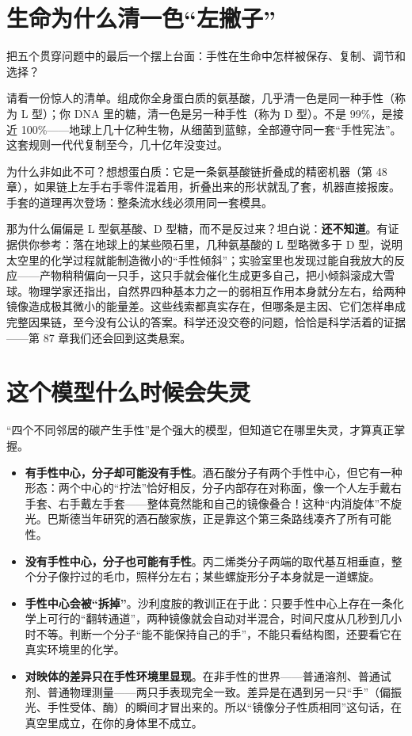 \section{生命为什么清一色“左撇子”}

把五个贯穿问题中的最后一个摆上台面：手性在生命中怎样被保存、复制、调节和选择？

请看一份惊人的清单。组成你全身蛋白质的氨基酸，几乎清一色是同一种手性（称为 L 型）；你 DNA 里的糖，清一色是另一种手性（称为 D 型）。不是 99\%，是接近 100\%——地球上几十亿种生物，从细菌到蓝鲸，全部遵守同一套“手性宪法”。这套规则一代代复制至今，几十亿年没变过。

为什么非如此不可？想想蛋白质：它是一条氨基酸链折叠成的精密机器（第 48 章），如果链上左手右手零件混着用，折叠出来的形状就乱了套，机器直接报废。手套的道理再次登场：整条流水线必须用同一套模具。

那为什么偏偏是 L 型氨基酸、D 型糖，而不是反过来？坦白说：\textbf{还不知道}。有证据供你参考：落在地球上的某些陨石里，几种氨基酸的 L 型略微多于 D 型，说明太空里的化学过程就能制造微小的“手性倾斜”；实验室里也发现过能自我放大的反应——产物稍稍偏向一只手，这只手就会催化生成更多自己，把小倾斜滚成大雪球。物理学家还指出，自然界四种基本力之一的弱相互作用本身就分左右，给两种镜像造成极其微小的能量差。这些线索都真实存在，但哪条是主因、它们怎样串成完整因果链，至今没有公认的答案。科学还没交卷的问题，恰恰是科学活着的证据——第 87 章我们还会回到这类悬案。

\section{这个模型什么时候会失灵}

“四个不同邻居的碳产生手性”是个强大的模型，但知道它在哪里失灵，才算真正掌握。

\begin{itemize}[itemsep=2pt]
\item \textbf{有手性中心，分子却可能没有手性}。酒石酸分子有两个手性中心，但它有一种形态：两个中心的“拧法”恰好相反，分子内部存在对称面，像一个人左手戴右手套、右手戴左手套——整体竟然能和自己的镜像叠合！这种“内消旋体”不旋光。巴斯德当年研究的酒石酸家族，正是靠这个第三条路线凑齐了所有可能性。
\item \textbf{没有手性中心，分子也可能有手性}。丙二烯类分子两端的取代基互相垂直，整个分子像拧过的毛巾，照样分左右；某些螺旋形分子本身就是一道螺旋。
\item \textbf{手性中心会被“拆掉”}。沙利度胺的教训正在于此：只要手性中心上存在一条化学上可行的“翻转通道”，两种镜像就会自动对半混合，时间尺度从几秒到几小时不等。判断一个分子“能不能保持自己的手”，不能只看结构图，还要看它在真实环境里的化学。
\item \textbf{对映体的差异只在手性环境里显现}。在非手性的世界——普通溶剂、普通试剂、普通物理测量——两只手表现完全一致。差异是在遇到另一只“手”（偏振光、手性受体、酶）的瞬间才冒出来的。所以“镜像分子性质相同”这句话，在真空里成立，在你的身体里不成立。
\end{itemize}

